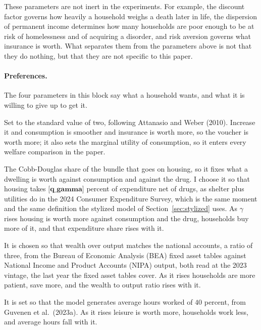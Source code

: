 \documentclass[10pt]{article}
\begin{document}
These parameters are not inert in the experiments. For example, the discount
factor governs how heavily a household weighs a death later in life, the dispersion
of permanent income determines how many households are poor enough to be at risk of
homelessness and of acquiring a disorder, and risk aversion governs what insurance
is worth. What separates them from the parameters above is not that they do nothing,
but that they are not specific to this paper.




\paragraph{Preferences.} The four parameters in this block say what a household wants, and what it is willing to give up to get it.
\begin{description}\setlength{\itemsep}{0.25em}\setlength{\parskip}{0em}
\item[$\sigma$, risk aversion.] Set to the standard value of two, following
Attanasio and Weber (2010). Increase it and consumption is smoother and insurance is
worth more, so the voucher is worth more; it also sets the marginal utility of
consumption, so it enters every welfare comparison in the paper.
\item[$\gamma$, the weight on housing services.] The Cobb-Douglas share of the
bundle that goes on housing, so it fixes what a dwelling is worth against
consumption and against the drug. I choose it so that housing takes $\textbf{[q_gamma]}$ percent of expenditure net of drugs, as
shelter plus utilities do in the 2024 Consumer Expenditure Survey, which is the same
moment and the same definition the stylized model of Section~\ref{sec:stylized}
uses. As $\gamma$
rises housing is worth more against consumption and the drug, households buy more of
it, and that expenditure share rises with it.
\item[$\beta$, the discount factor.] It is chosen so that wealth over output
matches the national accounts, a ratio of three, from the Bureau of Economic Analysis (BEA) fixed asset tables
against National Income and Product Accounts (NIPA) output, both read at the 2023 vintage, the last year the fixed asset tables cover. As it rises households are more patient, save more, and the
wealth to output ratio rises with it.
\item[$\omega_{\ell}$, the weight on leisure.] It is set so that the model
generates average hours worked of $40$ percent, from Guvenen et al.\ (2023a). As it
rises leisure is worth more, households work less, and average hours fall with
it.
\end{description}
\end{document}
